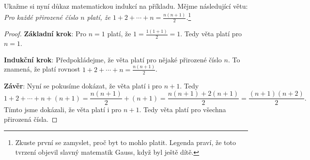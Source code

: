 \begin{example}
  Ukažme si nyní důkaz matematickou indukcí na příkladu. Mějme následující větu: \textit{Pro každé přirozené číslo $n$ platí, že $1 + 2 + \cdots + n = \frac{n(n+1)}{2}$.}\footnote{Zkuste první se zamyslet, proč byt to mohlo platit. Legenda praví, že toto tvrzení objevil slavný matematik Gauss, když byl ještě dítě.}  

  \begin{proof}

    \textbf{Základní krok}: Pro $n = 1$ platí, že $1 = \frac{1(1+1)}{2} = 1$. Tedy věta platí pro $n = 1$.

    \textbf{Indukční krok}: Předpokládejme, že věta platí pro nějaké přirozené číslo $n$. To znamená, že platí rovnost $1 + 2 + \cdots + n = \frac{n(n+1)}{2}$.

    \textbf{Závěr}: Nyní se pokusíme dokázat, že věta platí i pro $n+1$. Tedy
    \begin{equation}
      1 + 2 + \cdots + n + (n+1) = \frac{n(n+1)}{2} + (n+1) = \frac{n(n+1) + 2(n+1)}{2} = \frac{(n+1)(n+2)}{2}.
    \end{equation}
    Tímto jsme dokázali, že věta platí i pro $n+1$. Tedy věta platí pro všechna přirozená čísla.
  \end{proof}
\end{example}